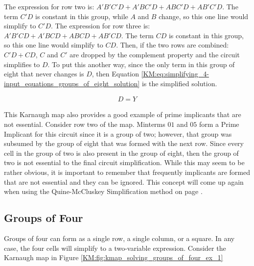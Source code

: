 The expression for row two is: $ A'B'C'D + A'BC'D + ABC'D + AB'C'D $. The term $ C'D $ is constant in this group, while $ A $ and $ B $ change, so this one line would simplify to $ C'D $. The expression for row three is: $ A'B'CD + A'BCD + ABCD + AB'CD $. The term $ CD $ is constant in this group, so this one line would simplify to $ CD $. Then, if the two rows are combined: $ C'D + CD $, $ C $ and $ C' $ are dropped by the complement property and the circuit simplifies to $ D $. To put this another way, since the only term in this group of eight that never changes is $ D $, then Equation \ref{KM:eq:simplifying_4-input_equations_groups_of_eight_solution} is the simplified solution.

\begin{align}
  \label{KM:eq:simplifying_4-input_equations_groups_of_eight_solution}
  D = Y
\end{align}

This Karnaugh map also provides a good example of prime implicants that are not essential. Consider row two of the map. Minterms $ 01 $ and $ 05 $ form a Prime Implicant for this circuit since it is a group of two; however, that group was subsumed by the group of eight that was formed with the next row. Since every cell in the group of two is also present in the group of eight, then the group of two is not essential to the final circuit simplification. While this may seem to be rather obvious, it is important to remember that frequently implicants are formed that are not essential and they can be ignored. This concept will come up again when using the Quine-McCluskey Simplification method on page \pageref{ASM:sec:quine-mccluskey_simplification_method}. 

\subsection{Groups of Four}
\label{KM:subsec:groups_of_4}

Groups of four can form as a single row, a single column, or a square. In any case, the four cells will simplify to a two-variable expression. Consider the Karnaugh map in Figure \ref{KM:fig:kmap_solving_groups_of_four_ex_1} 


